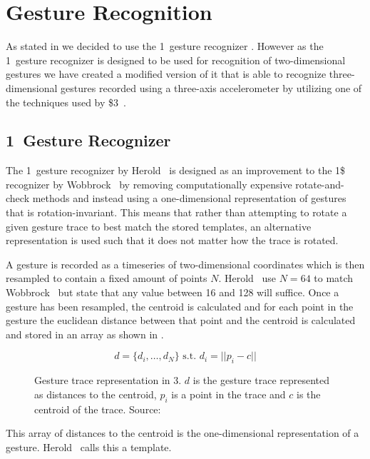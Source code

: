 \section{Gesture Recognition}
\label{sec:design:gesture-recognition}

As stated in  we decided to use the 1\textcent~gesture recognizer \cite{herold20121}.
However as the 1\textcent~gesture recognizer is designed to be used for recognition of two-dimensional gestures we have created a modified version of it that is able to recognize three-dimensional gestures recorded using a three-axis accelerometer by utilizing one of the techniques used by \$3~\cite{three-dollar}.

\subsection{1\textcent~Gesture Recognizer}
The 1\textcent~gesture recognizer by Herold \etal~is designed as an improvement to the 1\$ recognizer \cite{wobbrock2007gestures} by Wobbrock \etal~by removing computationally expensive rotate-and-check methods and instead using a one-dimensional representation of gestures that is rotation-invariant.
This means that rather than attempting to rotate a given gesture trace to best match the stored templates, an alternative representation is used such that it does not matter how the trace is rotated.

A gesture is recorded as a timeseries of two-dimensional coordinates which is then resampled to contain a fixed amount of points $N$.
Herold \etal~use $N = 64$ to match Wobbrock \etal~but state that any value between 16 and 128 will suffice.
Once a gesture has been resampled, the centroid is calculated and for each point in the gesture the euclidean distance between that point and the centroid is calculated and stored in an array as shown in .

\begin{figure}[h]
\[ d = \{d_i,\ldots,d_N\} \text{ s.t. } d_i=||p_i-c|| \]
\caption{Gesture trace representation in 3\textcent. $d$ is the gesture trace represented as distances to the centroid, $p_i$ is a point in the trace and $c$ is the centroid of the trace. Source:~\cite{herold20121}}
\label{eq:one-cent-trace-duplicate}
\end{figure}

This array of distances to the centroid is the one-dimensional representation of a gesture. Herold \etal~calls this a template.


